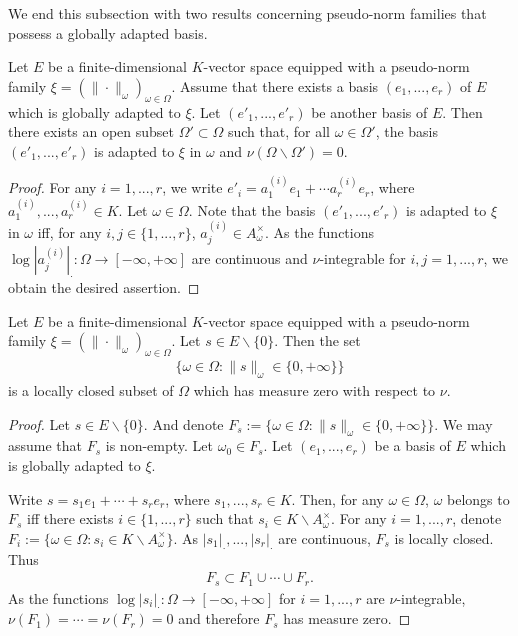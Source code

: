 \documentclass [11pt,reqno]{amsart}
\newcommand{\1}{\mathmybb{1}}
\def\setminus{\smallsetminus}
\begin{document}
We end this subsection with two results concerning pseudo-norm families that possess a globally adapted basis.

\begin{lemma} 
\label{lemma:pseudo-norm_family_globally_adapted}
Let $E$ be a finite-dimensional $K$-vector space equipped with a pseudo-norm family $\xi=(\|\cdot\|_{\omega})_{\omega\in\Omega}$. Assume that there exists a basis $(e_1,...,e_r)$ of $E$ which is globally adapted to $\xi$. Let $(e'_1,...,e'_{r})$ be another basis of $E$. Then there exists an open subset $\Omega'\subset \Omega$ such that, for all $\omega\in \Omega'$, the basis $(e'_1,...,e'_{r})$ is adapted to $\xi$ in $\omega$ and $\nu(\Omega\setminus \Omega')=0$. 
\end{lemma}

\begin{proof}
For any $i=1,...,r$, we write $e'_{i}= a_{1}^{(i)}e_{1} + \cdots a_{r}^{(i)}e_{r}$, where $a_{1}^{(i)},...,a_{r}^{(i)} \in K$. Let $\omega\in \Omega$. Note that the basis $(e'_1,...,e'_{r})$ is adapted to $\xi$ in $\omega$ iff, for any $i,j \in \{1,...,r\}$, $a_{j}^{(i)}\in A^{\times}_{\omega}$. As the functions $\log|a_{j}^{(i)}|_{\cdot} : \Omega \to [-\infty,+\infty]$ are continuous and $\nu$-integrable for $i,j=1,...,r$, we obtain the desired assertion.
\end{proof}

\begin{lemma} 
\label{lemma:pseudo-norm_family_singular}
Let $E$ be a finite-dimensional $K$-vector space equipped with a pseudo-norm family $\xi=(\|\cdot\|_{\omega})_{\omega\in\Omega}$. Let $s\in E\setminus\{0\}$. Then the set
\begin{align*}
\{\omega\in\Omega : \|s\|_{\omega} \in \{0,+\infty\}\}
\end{align*}
is a locally closed subset of $\Omega$ which has measure zero with respect to $\nu$.
\end{lemma}

\begin{proof}
Let $s\in E\setminus\{0\}$. And denote $F_s := \{\omega\in\Omega : \|s\|_{\omega} \in \{0,+\infty\}\}$. We may assume that $F_s$ is non-empty. Let $\omega_0\in F_s$. Let $(e_1,...,e_r)$ be a basis of $E$ which is globally adapted to $\xi$. 

Write $s= s_1e_1 +\cdots + s_r e_r$, where $s_1,...,s_r\in K$. Then, for any $\omega\in \Omega$, $\omega$ belongs to $F_s$ iff there exists $i\in \{1,...,r\}$ such that $s_i \in K \setminus A^{\times}_{\omega}$. For any $i=1,...,r$, denote $F_{i}:=\{\omega\in\Omega : s_i \in K \setminus A^{\times}_{\omega}\}$. As $|s_1|_{\cdot},...,|s_r|_{\cdot}$ are continuous, $F_s$ is locally closed. Thus
\begin{align*}
F_s \subset F_1 \cup \cdots \cup F_r.
\end{align*}
As the functions $\log|s_i|_{\cdot} : \Omega \to [-\infty,+\infty]$ for $i=1,...,r$ are $\nu$-integrable, $\nu(F_1)=\cdots=\nu(F_r)=0$ and therefore $F_s$ has measure zero.
\end{proof}
\end{document}
